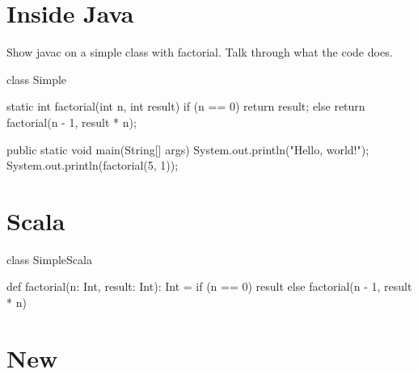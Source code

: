 \documentclass{book}
\begin{document}
\section{Inside Java}

Show javac on a simple class with factorial. Talk through what the code does.

\begin{javacode}
class Simple {

  static int factorial(int n, int result) {
    if (n == 0) {
      return result;
    }
    else {
      return factorial(n - 1, result * n);
    }
  }

  public static void main(String[] args) {
    System.out.println("Hello, world!");
     System.out.println(factorial(5, 1));
  }

}
\end{javacode}


\section{Scala}

\begin{scalacode}
class SimpleScala {

  def factorial(n: Int, result: Int): Int = {
    if (n == 0) {
      result
    }
    else {
      factorial(n - 1, result * n)
    }
  }

}
\end{scalacode}


\section{New}
\end{document}
